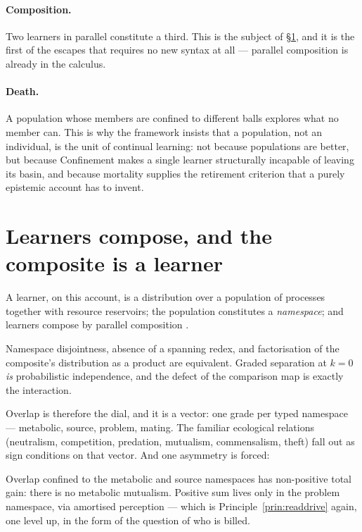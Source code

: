 \paragraph{Composition.} Two learners in parallel constitute a third. This is the
subject of \S\ref{sec:compose}, and it is the first of the escapes that requires no
new syntax at all --- parallel composition is already in the calculus.

\paragraph{Death.} A population whose members are confined to different balls
explores what no member can. This is why the framework insists that a population,
not an individual, is the unit of continual learning: not because populations are
better, but because Confinement makes a single learner structurally incapable of
leaving its basin, and because mortality supplies the retirement criterion that a
purely epistemic account has to invent.

\section{Learners compose, and the composite is a learner}
\label{sec:compose}

A learner, on this account, is a distribution over a population of processes
together with resource reservoirs; the population constitutes a \emph{namespace};
and learners compose by parallel composition \cite{ComposeNote}.

\begin{theorem}[Factorisation]
\label{thm:factor}
Namespace disjointness, absence of a spanning redex, and factorisation of the
composite's distribution as a product are equivalent. Graded separation at $k=0$
\emph{is} probabilistic independence, and the defect of the comparison map is
exactly the interaction.
\end{theorem}

Overlap is therefore the dial, and it is a vector: one grade per typed namespace
--- metabolic, source, problem, mating. The familiar ecological relations
(neutralism, competition, predation, mutualism, commensalism, theft) fall out as
sign conditions on that vector. And one asymmetry is forced:

\begin{proposition}
\label{prop:coopepis}
Overlap confined to the metabolic and source namespaces has non-positive total
gain: there is no metabolic mutualism. Positive sum lives only in the problem
namespace, via amortised perception --- which is Principle~\ref{prin:readdrive}
again, one level up, in the form of the question of who is billed.
\end{proposition}


